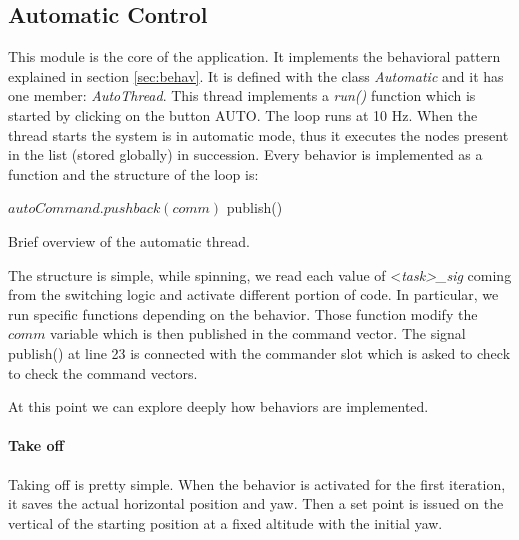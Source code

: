 \subsection{Automatic Control}
\label{sec:auto}
This module is the core of the application. It implements the behavioral pattern explained in section \ref{sec:behav}. It is defined with the class \textit{Automatic} and it has one member: \textit{AutoThread}. This thread implements a \textit{run()} function which is started by clicking on the button AUTO. The loop runs at 10 Hz. When the thread starts the system is in automatic mode, thus it executes the nodes present in the list (stored globally) in succession. Every behavior is implemented as a function and the structure of the loop is:
\begin{algorithm}
\begin{algorithmic} [1]
 
\ENDIF
{}			  
\ENDIF
{}			  
\ENDIF
{}		  
\ENDIF
{}			  
\ENDIF
{}			  
\ENDIF
\STATE $autoCommand.pushback(comm)$ 
\STATE publish()
\ENDWHILE
\end{algorithmic}
\label{alg:autothread}
\caption{Brief overview of the automatic thread.}
\end{algorithm}
The structure is simple, while spinning, we read each value of <\textit{task>\_sig} coming from the switching logic and activate different portion of code. In particular, we run specific functions depending on the behavior. Those function modify the $comm$ variable which is then published in the command vector. The signal publish() at line 23 is connected with the commander slot which is asked to check to check the command vectors. 

At this point we can explore deeply how behaviors are implemented.

\paragraph{Take off} Taking off is pretty simple. When the behavior is activated for the first iteration, it saves the actual horizontal position and yaw. Then a set point is issued on the vertical of the starting position at a fixed altitude with the initial yaw. 


